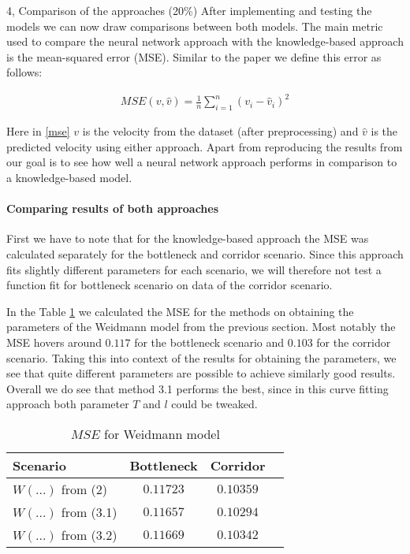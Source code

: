 \begin{task}{4, Comparison of the approaches (20\%)}
After implementing and testing the models we can now draw comparisons between both models. The main metric used to compare the neural network approach with the knowledge-based approach is the mean-squared error (MSE). Similar to the paper \cite{tordeux2020prediction} we define this error as follows:

\begin{align}
    MSE(v,\hat{v}) =\frac{1}{n}\sum_{i=1}^n (v_i - \hat{v}_i)^2\label{mse}
\end{align}

Here in \ref{mse} $v$ is the velocity from the dataset (after preprocessing) and $\hat{v}$ is the predicted velocity using either approach. Apart from reproducing the results from \cite{tordeux2020prediction} our goal is to see how well a neural network approach performs in comparison to a knowledge-based model.

\paragraph{Comparing results of both approaches}
First we have to note that for the knowledge-based approach the MSE was calculated separately for the bottleneck and corridor scenario. Since this approach fits slightly different parameters for each scenario, we will therefore not test a function fit for bottleneck scenario on data of the corridor scenario.

In the Table \ref{Tab:mse-weid} we calculated the MSE for the methods on obtaining the parameters of the Weidmann model from the previous section. Most notably the MSE hovers around $0.117$ for the bottleneck scenario and $0.103$ for the corridor scenario. Taking this into context of the results for obtaining the parameters, we see that quite different parameters are possible to achieve similarly good results. Overall we do see that method 3.1 performs the best, since in this curve fitting approach both parameter $T$ and $l$ could be tweaked.

\begin{table}[H]
\centering
\begin{tabular}{ |l|c|c|c| }
\hline
Scenario & Bottleneck & Corridor\\
\hline
$W(...)$ from (2) & $0.11723$ & $0.10359$\\
\hline
$W(...)$ from (3.1) & $0.11657$ & $0.10294$\\
\hline
$W(...)$ from (3.2) & $0.11669$ & $0.10342$\\
\hline
\end{tabular}
\caption{$MSE$ for Weidmann model}
\label{Tab:mse-weid}
\end{table}


\end{task}
